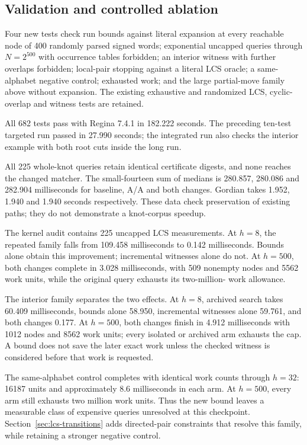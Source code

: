 \subsection{Validation and controlled ablation}

Four new tests check run bounds against literal expansion at every reachable
node of 400 randomly parsed signed words; exponential uncapped queries
through $N=2^{500}$ with occurrence tables forbidden; an interior witness
with further overlaps forbidden; local-pair stopping against a literal
LCS oracle; a same-alphabet negative control; exhausted work; and the
large partial-move family above without expansion. The existing exhaustive
and randomized LCS, cyclic-overlap and witness tests are retained.

All 682 tests pass with Regina 7.4.1 in 182.222 seconds. The preceding
ten-test targeted run passed in 27.990 seconds; the integrated run also
checks the interior example with both root cuts inside the long run.



All 225 whole-knot queries retain identical certificate digests, and none
reaches the changed matcher. The small-fourteen sum of medians is 280.857,
280.086 and 282.904 milliseconds for baseline, A/A and both changes.
Gordian takes 1.952, 1.940 and 1.940 seconds respectively. These data check
preservation of existing paths; they do not demonstrate a knot-corpus speedup.



The kernel audit contains 225 uncapped LCS measurements. At $h=8$, the
repeated family falls from 109.458 milliseconds to 0.142 milliseconds.
Bounds alone obtain this improvement; incremental witnesses alone do not.
At $h=500$, both changes complete in 3.028 milliseconds, with 509 nonempty
nodes and 5562 work units, while the original query exhausts its two-million-
work allowance.

The interior family separates the two effects. At $h=8$, archived search
takes 60.409 milliseconds, bounds alone 58.950, incremental witnesses alone
59.761, and both changes 0.177. At $h=500$, both changes finish in 4.912
milliseconds with 1012 nodes and 8562 work units; every isolated or archived
arm exhausts the cap. A bound does not save the later exact work unless
the checked witness is considered before that work is requested.

The same-alphabet control completes with identical work counts through
$h=32$: 16187 units and approximately 8.6 milliseconds in each arm.
At $h=500$, every arm still exhausts two million work units. Thus the new
bound leaves a measurable class of expensive queries unresolved at this
checkpoint. Section~\ref{sec:lcs-transitions} adds directed-pair constraints
that resolve this family, while retaining a stronger negative control.

